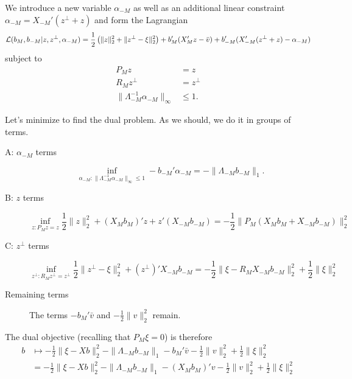 \documentclass{article}
\begin{document}
          We introduce a new variable $\alpha_{-M}$ as well as an additional linear constraint $\alpha_{-M}=X_{-M}'(z^{\perp}+z)$ and form the Lagrangian
          $${\cal L}(b_M, b_{-M}|z,z^{\perp},\alpha_{-M}) = \frac{1}{2} \left(\|z\|^2_2 + \|z^{\perp}-\xi\|^2_2 \right) + b_M'(X_M'z-\bar{v}) + b_{-M}'(X_{-M}'(z^{\perp}+z) - \alpha_{-M})
          $$
          subject to
          $$
          \begin{aligned}
            P_Mz &= z \\
            R_Mz^{\perp} &= z^{\perp} \\
            \|\Lambda_{-M}^{-1}\alpha_{-M}\|_{\infty} &\leq 1.
            \end{aligned}
          $$

          Let's minimize to find the dual problem. As we should, we do it in groups of terms.
          \begin{description}
            \item[A: $\alpha_{-M}$ terms]
            $$\inf_{\alpha_{-M}: \|\Lambda_{-M}^{-1}\alpha_{-M}\|_{\infty} \leq 1} -b_{-M}'\alpha_{-M} = -\|\Lambda_{-M}b_{-M}\|_1.
              $$
            \item[B: $z$ terms]
              $$
              \inf_{z:P_Mz=z} \frac{1}{2} \|z\|^2_2 + (X_Mb_M)'z + z'(X_{-M}b_{-M}) = -\frac{1}{2}\|P_M(X_Mb_M + X_{-M}b_{-M})\|^2_2
              $$
            \item[C: $z^{\perp}$ terms]
              $$
              \inf_{z^{\perp}: R_Mz^{\perp}=z^{\perp}} \frac{1}{2}\|z^{\perp}-\xi\|^2_2 + (z^{\perp})'X_{-M}b_{-M} = -\frac{1}{2} \|\xi - R_MX_{-M}b_{-M}\|^2_2 + \frac{1}{2} \|\xi\|^2_2
              $$
            \item[Remaining terms]
              The terms $-b_M'\bar{v}$ and $ - \frac{1}{2} \|v\|^2_2$ remain.
          \end{description}

          The dual objective (recalling that $P_M\xi=0$) is therefore
          $$
          \begin{aligned}
          b &\mapsto -\frac{1}{2}\|\xi - Xb\|^2_2 - \|\Lambda_{-M}b_{-M}\|_1 - b_M'\bar{v} - \frac{1}{2} \|v\|^2_2 + \frac{1}{2} \|\xi\|^2_2 \\
          &= -\frac{1}{2}\|\xi - Xb\|^2_2 - \|\Lambda_{-M}b_{-M}\|_1 - (X_Mb_M)'v - \frac{1}{2} \|v\|^2_2 + \frac{1}{2} \|\xi\|^2_2 \\
          \end{aligned}
          $$
\end{document}
